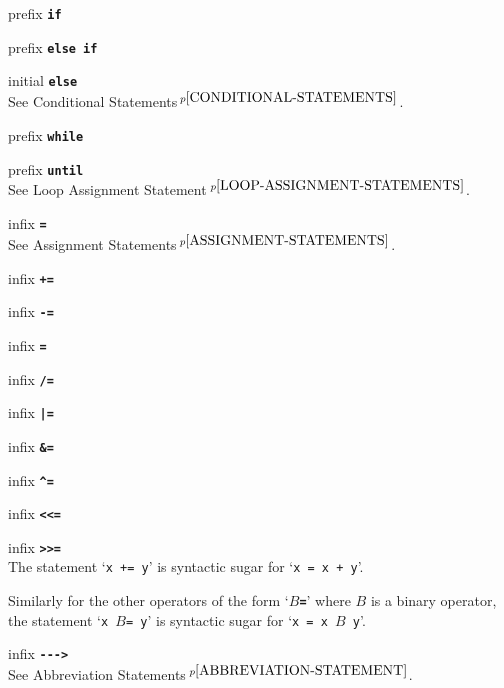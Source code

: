 \documentclass[12pt]{article}
\newcommand{\TT}[1]{{\tt \bfseries #1}}
\newcommand{\pagnote}[1]{$\,^{p\pageref{#1}}$}
\newenvironment{itemlist}[1][1.2in]%
	{\begin{list}{}{\setlength{\labelwidth}{#1}%
		        \setlength{\leftmargin}{\labelwidth}%
		        \addtolength{\leftmargin}{+0.2in}%
		        \renewcommand{\makelabel}[1]{##1\hfill}}}%
	{\end{list}}
\begin{document}
\begin{itemlist}[0.2in]
\item[prefix \TT{if}]
\item[prefix \TT{else if}] \vspace*{-0.15in}
\item[initial \TT{else}] \vspace*{-0.15in} ~\\
See Conditional Statements\pagnote{CONDITIONAL-STATEMENTS}.

\item[prefix \TT{while}]
\item[prefix \TT{until}] \vspace*{-0.15in} ~\\
See Loop Assignment Statement\pagnote{LOOP-ASSIGNMENT-STATEMENTS}.

\item[infix \TT{=}] ~\\
See Assignment Statements\pagnote{ASSIGNMENT-STATEMENTS}.

\item[infix \TT{+=}]
\item[infix \TT{-=}] \vspace*{-0.15in}
\item[infix \TT{*=}] \vspace*{-0.15in}
\item[infix \TT{/=}] \vspace*{-0.15in}
\item[infix \TT{|=}] \vspace*{-0.15in}
\item[infix \TT{\&=}] \vspace*{-0.15in}
\item[infix \TT{\textasciicircum=}] \vspace*{-0.15in}
\item[infix \TT{<{}<{}=}] \vspace*{-0.15in}
\item[infix \TT{>{}>{}=}] \vspace*{-0.15in} ~\\
The statement `{\tt x += y}' is syntactic sugar for `{\tt x = x + y}'.

Similarly for the other operators of the form `\TT{$B$=}'
where $B$ is a binary operator,
the statement `{\tt x $B$= y}' is syntactic sugar for `{\tt x = x $B$ y}'.

\item[infix \TT{-{}-{}-{}>}] ~\\
See Abbreviation Statements\pagnote{ABBREVIATION-STATEMENT}.


\end{itemlist}
\end{document}
